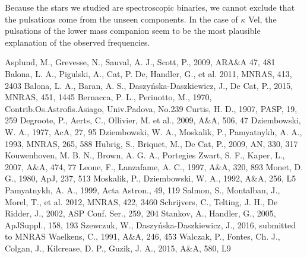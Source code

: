 \documentclass{ptapap}
\begin{document}
Because the stars we studied are spectroscopic binaries, we cannot exclude that the pulsations come from the unseen components.
In the case of $\kappa$  Vel, the pulsations of the lower mass companion seem to be the most plausible explanation of the observed frequencies.


\small
\begin{thebibliography}{}
  \bibitem{} Asplund, M., Grevesse, N., Sauval, A. J., Scott, P., 2009, ARA\&A 47, 481
  \bibitem{} Balona, L. A., Pigulski, A., Cat, P. De, Handler, G., et al. 2011, MNRAS, 413, 2403
  \bibitem{} Balona, L. A., Baran, A. S., Daszy\'nska-Daszkiewicz, J., De Cat, P., 2015, MNRAS, 451, 1445
  \bibitem{} Bernacca, P. L., Perinotto, M., 1970, Contrib.Os.Astrofis.Asiago, Univ.Padova, No.239
  \bibitem{} Curtis, H. D., 1907, PASP, 19, 259
  \bibitem{} Degroote, P., Aerts, C., Ollivier, M. et al., 2009, A\&A, 506, 47
  \bibitem{} Dziembowski, W. A., 1977, AcA, 27, 95
  \bibitem{} Dziembowski, W. A., Moskalik, P., Pamyatnykh, A. A., 1993, MNRAS, 265, 588
  \bibitem{} Hubrig, S., Briquet, M., De Cat, P., 2009, AN, 330, 317
  \bibitem{} Kouwenhoven, M. B. N., Brown, A. G. A., Portegies Zwart, S. F., Kaper, L., 2007, A\&A, 474, 77
  \bibitem{} Leone, F., Lanzafame, A. C., 1997, A\&A, 320, 893
  \bibitem{} Monet, D. G., 1980, ApJ, 237, 513
  \bibitem{} Moskalik, P., Dziembowski, W. A., 1992, A\&A, 256, L5
  \bibitem{} Pamyatnykh, A. A., 1999, Acta Astron., 49, 119
  \bibitem{} Salmon, S., Montalban, J., Morel, T., et al. 2012, MNRAS, 422, 3460
  \bibitem{} Schrijvers, C., Telting, J. H., De Ridder, J., 2002, ASP Conf. Ser., 259, 204
  \bibitem{} Stankov, A., Handler, G., 2005, ApJSuppl., 158, 193
  \bibitem{} Szewczuk, W., Daszy\'nska-Daszkiewicz, J., 2016, submitted to MNRAS
  \bibitem{} Waelkens, C., 1991, A\&A, 246, 453
  \bibitem{} Walczak, P., Fontes, Ch. J., Colgan, J., Kilcrease, D. P., Guzik, J. A., 2015, A\&A, 580, L9
\end{thebibliography}

%
%
\end{document}
